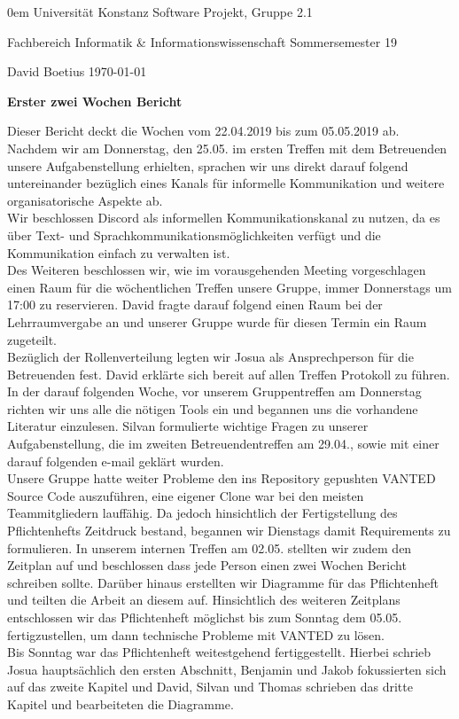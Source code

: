 \documentclass[]{article}
\date{}
\begin{document}
{\footnotesize \parindent0em
    {\sc Universität Konstanz} \hfill {\sc Software Projekt, Gruppe 2.1}\par
    {\sc Fachbereich Informatik \& Informationswissenschaft} \hfill Sommersemester 19 \par
    David Boetius \hfill \today\par
    \bigskip
    \begin{center}
    {\LARGE\bf Erster zwei Wochen Bericht}
    \bigskip
    \end{center}
}

Dieser Bericht deckt die Wochen vom 22.04.2019 bis zum 05.05.2019 ab. \\

Nachdem wir am Donnerstag, den 25.05. im ersten Treffen mit dem Betreuenden unsere Aufgabenstellung erhielten, sprachen wir uns direkt darauf folgend untereinander bezüglich eines Kanals für informelle Kommunikation und weitere organisatorische Aspekte ab.  \\
Wir beschlossen Discord als informellen Kommunikationskanal zu nutzen, da es über Text- und Sprachkommunikationsmöglichkeiten verfügt und die Kommunikation einfach zu verwalten ist. \\
Des Weiteren beschlossen wir, wie im vorausgehenden Meeting vorgeschlagen einen Raum für die wöchentlichen Treffen unsere Gruppe, immer Donnerstags um 17:00 zu reservieren. David fragte darauf folgend einen Raum bei der Lehrraumvergabe an und unserer Gruppe wurde für diesen Termin ein Raum zugeteilt. \\
Bezüglich der Rollenverteilung legten wir Josua als Ansprechperson für die Betreuenden fest. David erklärte sich bereit auf allen Treffen Protokoll zu führen.  \\

In der darauf folgenden Woche, vor unserem Gruppentreffen am Donnerstag richten wir uns alle die nötigen Tools ein und begannen uns die vorhandene Literatur einzulesen. Silvan formulierte wichtige Fragen zu unserer Aufgabenstellung, die im zweiten Betreuendentreffen am 29.04., sowie mit einer darauf folgenden e-mail geklärt wurden. \\
Unsere Gruppe hatte weiter Probleme den ins Repository gepushten VANTED Source Code auszuführen, eine eigener Clone war bei den meisten Teammitgliedern lauffähig. Da jedoch hinsichtlich der Fertigstellung des Pflichtenhefts Zeitdruck bestand, begannen wir Dienstags damit Requirements zu formulieren. In unserem internen Treffen am 02.05. stellten wir zudem den Zeitplan auf und beschlossen dass jede Person einen zwei Wochen Bericht schreiben sollte. Darüber hinaus erstellten wir Diagramme für das Pflichtenheft und teilten die Arbeit an diesem auf. Hinsichtlich des weiteren Zeitplans entschlossen wir das Pflichtenheft möglichst bis zum Sonntag dem 05.05. fertigzustellen, um dann technische Probleme mit VANTED zu lösen. \\

Bis Sonntag war das Pflichtenheft weitestgehend fertiggestellt. Hierbei schrieb Josua hauptsächlich den ersten Abschnitt, Benjamin und Jakob fokussierten sich auf das zweite Kapitel und David, Silvan und Thomas schrieben das dritte Kapitel und bearbeiteten die Diagramme. 
\end{document}
